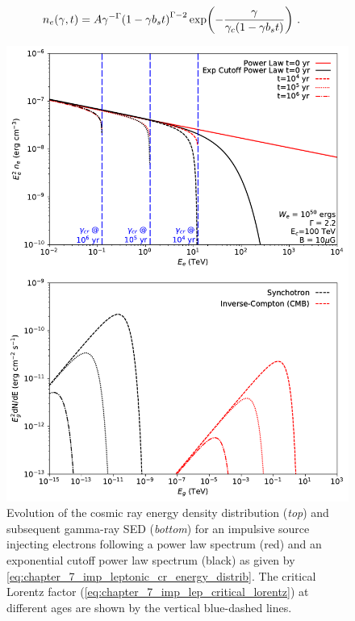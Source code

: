 \begin{equation}
    \begin{aligned}
    n_e\qty(\gamma,t)&=A\gamma^{-\Gamma}\qty(1-\gamma b_s t)^{\Gamma-2}\exp(-\frac{\gamma}{\gamma_c\qty(1-\gamma b_st)})\text{ .}
    \end{aligned} \label{eq:chapter_7_imp_leptonic_cr_energy_distrib}
\end{equation}
\begin{figure}[hbtp]
	\centering
	\includegraphics[width=1.0\textwidth]{07_Particle_Evolution/Images/evolution/impulsive_electron_total_spectrum.pdf}
	\caption{Evolution of the cosmic ray energy density distribution (\textit{top}) and subsequent gamma-ray SED (\textit{bottom}) for an impulsive source injecting electrons following a power law spectrum (red) and an exponential cutoff power law spectrum (black) as given by \autoref{eq:chapter_7_imp_leptonic_cr_energy_distrib}. The critical Lorentz factor (\autoref{eq:chapter_7_imp_lep_critical_lorentz}) at different ages are shown by the vertical blue-dashed lines.}
	\label{fig:chapter_7_impulsive_lepton_cr_spectrum}
\end{figure}
